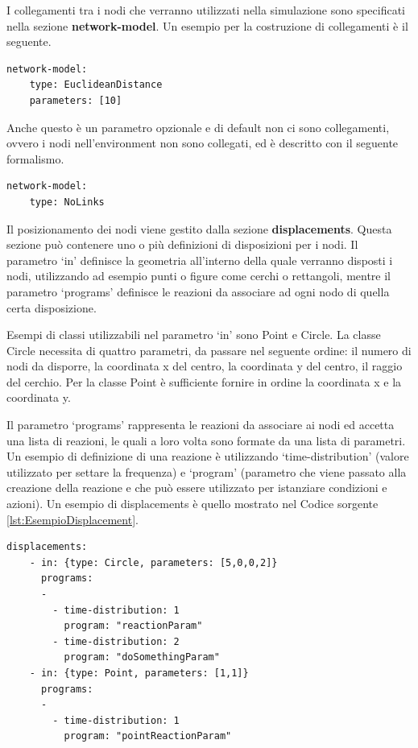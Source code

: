I collegamenti tra i nodi che verranno utilizzati nella simulazione sono specificati nella sezione \textbf{network-model}. Un esempio per la costruzione di collegamenti è il seguente.
\medskip
\begin{lstlisting}[firstnumber=1,caption={Funzione linking-rule}]
  network-model:
    type: EuclideanDistance
    parameters: [10]
\end{lstlisting}
Anche questo è un parametro opzionale e di default non ci sono collegamenti, ovvero i nodi nell'environment non sono collegati, ed è descritto con il seguente formalismo.
\medskip
\begin{lstlisting}[firstnumber=1,caption={Default linking-rule}]
  network-model:
    type: NoLinks
\end{lstlisting}

Il posizionamento dei nodi viene gestito dalla sezione \textbf{displacements}. Questa sezione può contenere uno o più definizioni di disposizioni per i nodi.
Il parametro `in' definisce la geometria all'interno della quale verranno disposti i nodi, utilizzando ad esempio punti o figure come cerchi o rettangoli, mentre il parametro `programs' definisce le reazioni da associare ad ogni nodo di quella certa disposizione.

Esempi di classi utilizzabili nel parametro `in' sono Point e Circle.
La classe Circle necessita di quattro parametri, da passare nel seguente ordine: il numero di nodi da disporre, la coordinata x del centro, la coordinata y del centro, il raggio del cerchio. Per la classe Point è sufficiente fornire in ordine la coordinata x e la coordinata y.

Il parametro `programs' rappresenta le reazioni da associare ai nodi ed accetta una lista di reazioni, le quali a loro volta sono formate da una lista di parametri. Un esempio di definizione di una reazione è utilizzando `time-distribution' (valore utilizzato per settare la frequenza) e `program' (parametro che viene passato alla creazione della reazione e che può essere utilizzato per istanziare condizioni e azioni).
Un esempio di displacements è quello mostrato nel Codice sorgente \ref{lst:EsempioDisplacement}.
\medskip
\begin{lstlisting}[firstnumber=1,label={lst:EsempioDisplacement},caption={Disposizione nodi e reazioni associate}]
  displacements:
    - in: {type: Circle, parameters: [5,0,0,2]}
      programs:
      -
        - time-distribution: 1
          program: "reactionParam"
        - time-distribution: 2
          program: "doSomethingParam"
    - in: {type: Point, parameters: [1,1]}
      programs:
      -
        - time-distribution: 1
          program: "pointReactionParam"
\end{lstlisting}
